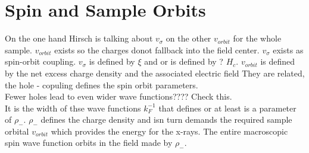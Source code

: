 \documentclass[prb,preprint]
{revtex4-1}
\begin{document}
\section{Spin and Sample Orbits}
\bigskip
On the one hand Hirsch is talking about $v_\sigma$ on the other $v_{orbit}$ for the whole sample.  $v_{orbit}$ exists so the charges donot fallback into the field center.  $v_\sigma$ exists as spin-orbit coupling.  $v_\sigma$ is defined by $\xi$ and or is defined by ? $H_c$.  $v_{orbit}$ is defined by the net excess charge density and the associated electric field  They are related, the hole - copuling defines the spin orbit parameters.
\\
Fewer holes lead to even wider  wave functions????  Check this.
\\
It is the width of thse wave functions $k_F^{-1}$ that defines or at least is a parameter of $\rho_-$.  $\rho_-$ defines the charge density and isn turn demands the required sample orbital $v_{orbit}$ which provides the energy for the x-rays.  The entire macroscopic spin wave function orbits in the field made by $\rho_-$.




\end{document}
